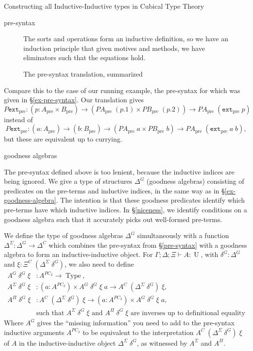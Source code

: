 \documentclass[runningheads]{llncs}
\DeclareMathOperator{\USet}{Type}
\DeclareMathOperator{\UU}{U}
\newcommand{\pre}[1]{{#1}_\text{pre}}
\newcommand{\tac}{\vdash}
\newcommand{\join}{\texttt{ext}}
\newcommand{\PA}{\mathit{PA}}
\newcommand{\PB}{\mathit{PB}}
\begin{document}
{\begin{section}{Constructing all Inductive-Inductive types in Cubical Type Theory}
\begin{subsection}{pre-syntax}
\begin{figure}[htpb]
\begin{flushleft}
    The sorts and operations form an inductive definition, so we have an induction principle that given motives and methods, we have eliminators such that the equations hold.
    \end{flushleft}
    
    \caption{\label{pre-syntax-translation}The pre-syntax translation, summarized}
\end{figure}

Compare this to the case of our running example, the pre-syntax for which was given in \S\ref{ex-pre-syntax}. Our translation gives \[\pre{P\join} : (p : \pre{A} \times \pre{B}) \to (\pre{\PA}\;(p.1)\times \pre{\PB}\;(p.2)) \to \pre{\PA}\;(\pre{\join}\;p)\] instead of \[\pre{P\join} : (a : \pre{A}) \to (b : \pre{B}) \to (\pre{\PA}\;a \times \pre{\PB}\;b) \to \pre{\PA}\;(\pre{\join}\;a\;b),\] but these are equivalent up to currying.

\end{subsection}
\begin{subsection}{goodness algebras}\label{goodness-algebra}

The pre-syntax defined above is too lenient, because the inductive indices are being ignored. We give a type of structures $\Delta^G$ (goodness algebras) consisting of predicates on the pre-terms and inductive indices, in the same way as in \S\ref{ex-goodness-algebra}. The intention is that these goodness predicates identify which pre-terms have which inductive indices. In \S\ref{niceness}, we identify conditions on a goodness algebra such that it accurately picks out well-formed pre-terms.

\begin{definition}
We define the type of goodness algebras $\Delta^G$ simultaneously with a function $\Delta^{\Sigma} : \Delta^G \to \Delta^C$ which combines the pre-syntax from \S\ref{pre-syntax} with a goodness algebra to form an inductive-inductive object. For $\Gamma ; \Delta ; \Xi \tac A : \UU$, with $\delta^G : \Delta^G$ and $\xi : \Xi^C\;(\Delta^\Sigma\;\delta^G)$, we also need to define
\begin{align*}
A^G\;\delta^G\;\xi &: A^{PC_2} \to \USet,\\
A^\Sigma\;\delta^G\;\xi &: (a : A^{PC_2}) \times A^G\;\delta^G\;\xi\;a \to A^C\;(\Delta^\Sigma\;\delta^G)\;\xi,\\
A^{\Pi}\;\delta^G\;\xi &:A^C\;(\Delta^\Sigma\;\delta^G)\;\xi \to (a : A^{PC_2}) \times A^G\;\delta^G\;\xi\;a,\\
&\text{such that $A^\Sigma\;\delta^G\;\xi$ and $A^{\Pi}\;\delta^G\;\xi$ are inverses up to definitional equality}
\end{align*}
Where $A^G$ gives the ``missing information'' you need to add to the pre-syntax inductive arguments $A^{PC_2}$ to be equivalent to the interpretation $A^C\;(\Delta^\Sigma\;\delta^G)\;\xi$ of $A$ in the inductive-inductive object $\Delta^\Sigma\;\delta^G$, as witnessed by $A^\Sigma$ and $A^\Pi$.


\end{definition}
\end{subsection}
\end{section}}
\end{document}
